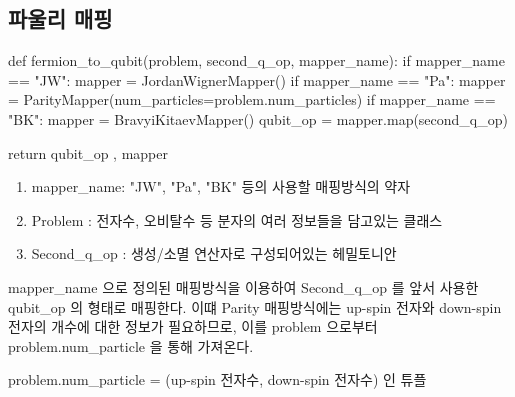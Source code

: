 \documentclass[11pt]{article}
\begin{document}
\subsection{파울리 매핑}
\begin{CodeBox}[title={Example: Python snippet}]
def fermion_to_qubit(problem, second_q_op, mapper_name):
  if mapper_name == "JW":
    mapper = JordanWignerMapper()
  if mapper_name == "Pa":
    mapper = ParityMapper(num_particles=problem.num_particles)
  if mapper_name == "BK":
    mapper = BravyiKitaevMapper()
  qubit_op = mapper.map(second_q_op)

  return qubit_op , mapper
\end{CodeBox} 
\begin{enumerate}[label=\textbf{*}, leftmargin=*]
  \item mapper\_name: "JW", "Pa", "BK" 등의 사용할 매핑방식의 약자
  \item Problem : 전자수, 오비탈수 등 분자의 여러 정보들을 담고있는 클래스
  \item Second\_q\_op : 생성/소멸 연산자로 구성되어있는 헤밀토니안
\end{enumerate}
mapper\_name 으로 정의된 매핑방식을 이용하여 Second\_q\_op 를 앞서 사용한 qubit\_op 의 형태로 매핑한다. 이떄 Parity 매핑방식에는 up-spin 전자와 down-spin 전자의 개수에 대한 정보가 필요하므로, 이를 problem 으로부터 problem.num\_particle 을 통해 가져온다. 

problem.num\_particle = (up-spin 전자수, down-spin 전자수) 인 튜플

\newpage
\end{document}
